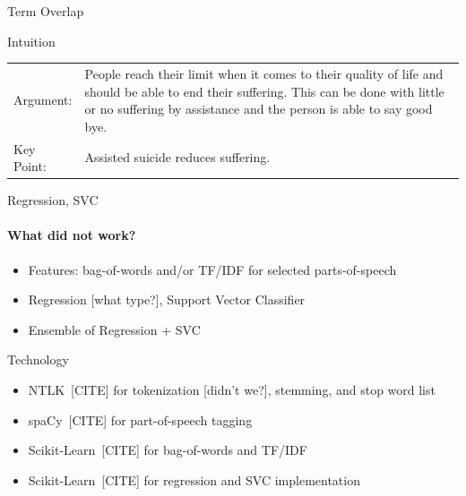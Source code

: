 \documentclass[english,handout]{mlutalk}
\newcommand{\TFIDF}{\mbox{TF/IDF}\xspace}
\newcommand{\todocite}{{\smaller\color{red}[CITE]}\xspace}
\newcommand{\todo}[1]{{\smaller\color{red}[#1]}}
\begin{document}
\begin{frame}[allowframebreaks]{Term Overlap}
\begin{block}{Intuition}
    \begin{example}
      \smaller
      \begin{tabular}{lp{}}
        Argument: & People reach their limit when it comes to their quality of life and should be able to end their {\color{blue} suffering}. This can be done with little or no {\color{blue} suffering} by {\color{orange} assistance} and the person is able to say good bye. \\
        Key Point: & {\color{orange} Assisted} suicide reduces {\color{blue} suffering}.
      \end{tabular}
    \end{example}
  \end{block}

\end{frame}

\begin{frame}{Regression, SVC}
  
  \framesubtitle{What did not work?}
  
  \begin{itemize}
    \item Features: bag-of-words and/or \TFIDF for selected parts-of-speech
    \item Regression \todo{what type?}, Support Vector Classifier
    \item Ensemble of Regression + SVC
  \end{itemize}
  
  \begin{block}{Technology}
      \begin{itemize}
        \item NTLK~\todocite for tokenization \todo{didn't we?}, stemming,  and stop word list
        \item spaCy~\todocite for part-of-speech tagging
        \item Scikit-Learn~\todocite for bag-of-words and \TFIDF
        \item Scikit-Learn~\todocite for regression and SVC implementation
      \end{itemize}
  \end{block}

\end{frame}
\end{document}

